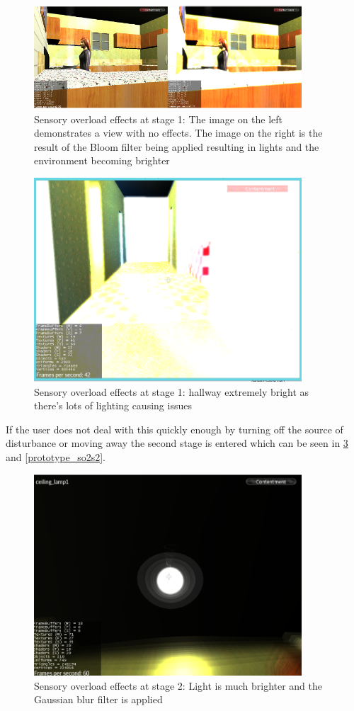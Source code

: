 \documentclass[11pt]{report}
\begin{document}
\begin{figure}[H]
\centering
\includegraphics[width=100mm]{images/prototype/old_sensoryeffects.png}
\caption{Sensory overload effects at stage 1: The image on the left demonstrates a view with no effects. The image on the right is the result of the Bloom filter being applied resulting in lights and the environment becoming brighter}
\label{prototype_so1s1}
\end{figure}

\begin{figure}[H]
\centering
\includegraphics[width=100mm]{images/prototype/hallway_so1.png}
\caption{Sensory overload effects at stage 1: hallway extremely bright as there's lots of lighting causing issues}
\label{prototype_so2s1}
\end{figure}

If the user does not deal with this quickly enough by turning off the source of disturbance or moving away the second stage is entered which can be seen in \ref{prototype_so1s2} and \ref{prototype_so2s2}. 

\begin{figure}[H]
\centering
\includegraphics[width=100mm]{images/prototype/bedroom_lightsensory.png}
\caption{Sensory overload effects at stage 2: Light is much brighter and the Gaussian blur filter is applied}
\label{prototype_so1s2}
\end{figure}
\end{document}
